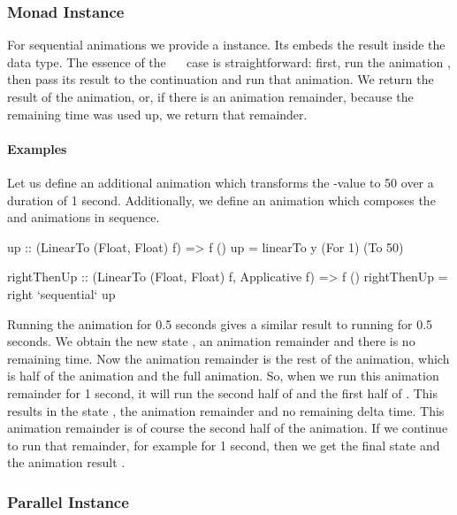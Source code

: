 \subsubsection{Monad Instance}

For sequential animations we provide a  instance. Its  embeds the
result  inside the  data type. The essence of the
~\hs{>>=}~ case is straightforward: first, run the animation
, then pass its result to the continuation  and run that animation.
We return the result of the animation, or, if there is an animation remainder,
because the remaining time was used up, we return that remainder.

\paragraph{Examples}

Let us define an additional animation  which transforms the -value to 50 over a duration of 1 second. Additionally, we define an animation  which composes the  and  animations in sequence.

\begin{code}
up :: (LinearTo (Float, Float) f) => f ()
up = linearTo y (For 1) (To 50)

rightThenUp :: (LinearTo (Float, Float) f, Applicative f) => f ()
rightThenUp = right `sequential` up
\end{code}

Running the  animation for 0.5 seconds gives a similar result
to running  for 0.5 seconds. We obtain the new state , an animation remainder  and there is no remaining time.
Now the animation remainder is the rest of the  animation,
which is half of the  animation and the full  animation. So,
when we run this animation remainder for 1 second, it will run the second half
of  and the first half of .  This results in the state
, the animation remainder  and no remaining delta time.
This animation remainder is of course the second half of the  animation.
If we continue to run that remainder, for example for 1 second, then we get the
final state  and the animation result \hs{()}.

\subsubsection{Parallel Instance}

